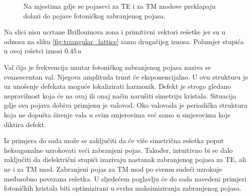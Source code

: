 \documentclass[utf8, seminar, numeric]{fer}
\begin{document}
\begin{figure}[ht]
\centering
    \qquad
	\caption{Na mjestima gdje se pojasevi za TE i za TM modove preklapaju dolazi
	do pojave fotoničkog zabranjenog pojasa.}
	\label{fig:triangular_lattice_holes}
\end{figure}

Na slici nisu ucrtane Brillouinova zona i primitivni vektori rešetke jer su u
odnosu na sliku \ref{fig:triangular_lattice} samo drugačijeg iznosa. Polumjer
stupića u ovoj rešetci iznosi ${0.45 \, a}$

\FloatBarrier

Val čija je frekvencija unutar fotoničkog zabranjenog pojasa naziva se
evanescentan val.
Njegova amplituda trnut će eksponencijalno. U ovu strukturu je uz unošenje
defekata moguće lokalizirati harmonik. Defekt je strogo gledano nepravilnost
koja će na ovaj ili onaj način narušiti simetriju kristala. Situacija gdje ova
pojava dobiva primjenu je valovod. Oko valovoda je periodička struktura koja
ne dopušta širenje vala u svim smjerovima već samo u smjerovima koje diktira
defekt.

Iz primjera do sada može se zaključiti da će više simetrična rešetka poput
heksagonalne uzrokovati veći zabranjeni pojas. Također, intuitivno bi se dalo
zaključiti da dielektrični stupići izazivaju nastanak zabranjenog pojasa za TE,
ali ne i za TM mod. Zabranjeni pojas za TM mod po svemu sudeći uzrokuje
međusobno povezana rešetka. U sljedećem poglavlju će do sada navedeni
primjeri fotoničkih kristala biti optimizirani u svrhu maksimiziranja zabranjenog
pojasa.
\end{document}
